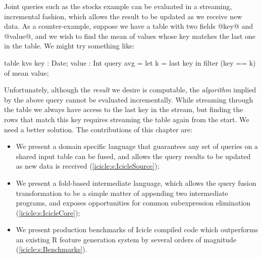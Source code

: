 
Joint queries such as the stocks example can be evaluated in a streaming, incremental fashion, which allows the result to be updated as we receive new data.
As a counter-example, suppose we have a table with two fields @key@ and @value@, and we wish to find the mean of values whose key matches the last one in the table.
We might try something like:

\begin{icicle}
  table kvs { key : Date; value : Int }
  query avg = let k = last key
              in  filter (key == k) of mean value;
\end{icicle}

Unfortunately, although the \emph{result} we desire is computable, the \emph{algorithm} implied by the above query cannot be evaluated incrementally.
While streaming through the table we always have access to the last key in the stream, but finding the rows that match this key requires streaming the table again from the start.
We need a better solution.
The contributions of this chapter are:
\begin{itemize}
\item
  We present a domain specific language that guarantees any set of queries on a shared input table can be fused, and allows the query results to be updated as new data is received (\cref{icicle:s:IcicleSource});

\item
  We present a fold-based intermediate language, which allows the query fusion transformation to be a simple matter of appending two intermediate programs, and exposes opportunities for common subexpression elimination (\cref{icicle:s:IcicleCore});

\item
  We present production benchmarks of Icicle compiled code which outperforms an existing R feature generation system by several orders of magnitude (\cref{icicle:s:Benchmarks}). 
\end{itemize}


